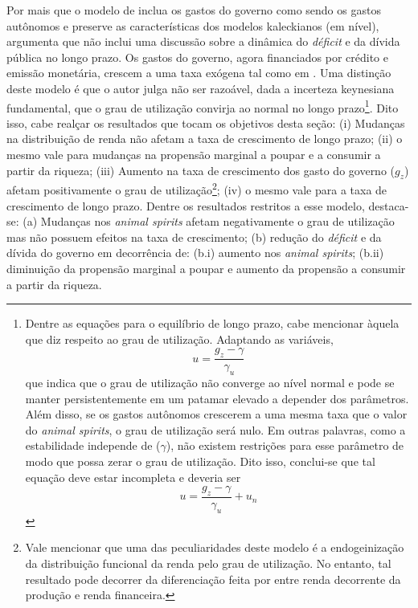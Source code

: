 


Por mais que o modelo de \textcite{allain_tackling_2015} inclua os gastos do governo como sendo os gastos autônomos e preserve as características dos modelos kaleckianos (em nível), \textcite{hein_autonomous_2018} argumenta que não inclui uma discussão sobre a dinâmica do \textit{déficit} e da dívida pública no longo prazo. Os gastos do governo, agora financiados por crédito e emissão monetária, crescem a uma taxa exógena tal como em \textcite{allain_tackling_2015}. Uma distinção deste modelo é que o autor julga não ser razoável, dada a incerteza keynesiana fundamental, que o grau de utilização convirja ao normal no longo prazo\footnote{
	Dentre as equações para o equilíbrio de longo prazo, cabe mencionar àquela que diz respeito ao grau de utilização. Adaptando as variáveis,
	$$
	u = \frac{g_z - \gamma}{\gamma_u}
	$$
	que indica que o grau de utilização não converge ao nível normal e pode se manter persistentemente em um patamar elevado a depender dos parâmetros. Além disso, se os gastos autônomos crescerem a uma mesma taxa que o valor do \textit{animal spirits}, o grau de utilização será nulo. Em outras palavras, como a estabilidade independe de ($\gamma$), não existem restrições para esse parâmetro de modo que possa zerar o grau de utilização. Dito isso, conclui-se que tal equação deve estar incompleta e deveria ser
	$$
	u = \frac{g_z - \gamma}{\gamma_u} + u_n
	$$
}. 
Dito isso, cabe realçar os resultados que tocam os objetivos desta seção: 
	(i) Mudanças na distribuição de renda não afetam a taxa de crescimento de longo prazo; 
	(ii) o mesmo vale para mudanças na propensão marginal a poupar e a consumir a partir da riqueza; 
	(iii) Aumento na taxa de crescimento dos gasto do governo ($g_z$) afetam positivamente o grau de utilização\footnote{
		Vale mencionar que uma das peculiaridades deste modelo é a endogeinização da distribuição funcional da renda pelo grau de utilização. No entanto, tal resultado pode decorrer da diferenciação feita por \textcite{hein_autonomous_2018} entre renda decorrente da produção e renda financeira.
		}; 
	(iv) o mesmo vale para a taxa de crescimento de longo prazo. 
Dentre os resultados restritos a esse modelo, destaca-se:  
	(a) Mudanças nos \textit{animal spirits} afetam negativamente o grau de utilização mas não possuem efeitos na taxa de crescimento; 
	(b) redução do \textit{déficit} e da dívida do governo em decorrência de: 
		(b.i) aumento nos \textit{animal spirits}; 
		(b.ii) diminuição da propensão marginal a poupar e aumento da propensão a consumir a partir da riqueza. 

